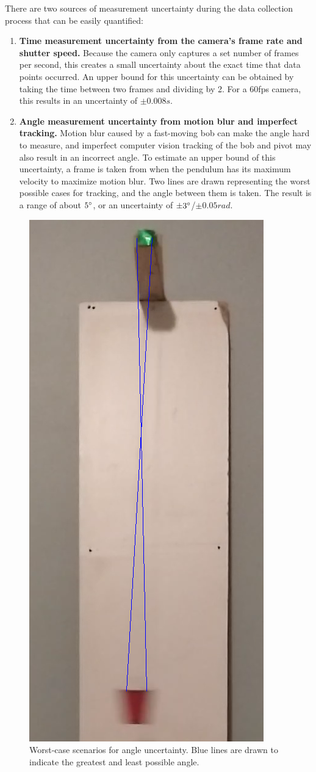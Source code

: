 \documentclass[aps,twocolumn,secnumarabic,nobalancelastpage,amsmath,amssymb,nofootinbib]{revtex4}
\begin{document}
There are two sources of measurement uncertainty during the data collection process that can be easily quantified:
\begin{enumerate}
    \item \textbf{Time measurement uncertainty from the camera's frame rate and shutter speed.} Because the camera only
          captures a set number of frames per second, this creates a small uncertainty about the exact time that data
          points occurred. An upper bound for this uncertainty can be obtained by taking the time between two frames and
          dividing by 2. For a 60fps camera, this results in an uncertainty of \(\pm 0.008\si{s}\).
    \item \textbf{Angle measurement uncertainty from motion blur and imperfect tracking.} Motion blur caused by a
          fast-moving bob can make the angle hard to measure, and imperfect computer vision tracking of the bob and
          pivot may also result in an incorrect angle. To estimate an upper bound of this uncertainty, a frame is taken
          from when the pendulum has its maximum velocity to maximize motion blur. Two lines are drawn representing the
          worst possible cases for tracking, and the angle between them is taken. The result is a range of about
          \(5\degree\), or an uncertainty of \(\pm 3\degree\)/\(\pm 0.05\si{rad}\).
\end{enumerate}
\begin{figure}[h]
    \includegraphics[width=0.3\linewidth]{uncert1.png}
    \caption{Worst-case scenarios for angle uncertainty. Blue lines are drawn to indicate the greatest and least
        possible angle.}
\end{figure}
\end{document}
